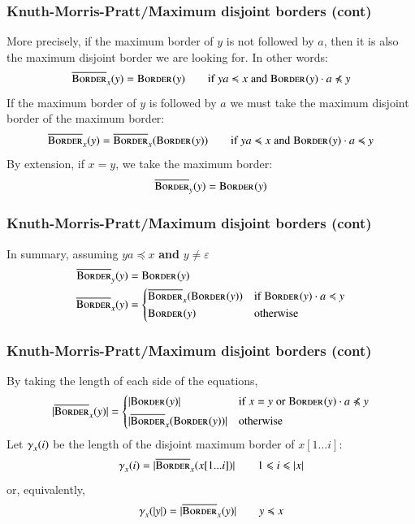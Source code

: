 %
\begin{frame}
\frametitle{Knuth-Morris-Pratt/Maximum disjoint borders (cont)}

More precisely, if the maximum border of \(y\) is not followed by
\(a\), then it is also the maximum disjoint border we are looking
for. In other words:
\[
\DBorder{x}{}{y} = \Border{}{y} \qquad \text{if} \; ya \preccurlyeq x
\; \text{and} \; \Border{}{y} \cdot a \npreccurlyeq y
\]
If the maximum border of \(y\) is followed by \(a\) we must take the
maximum disjoint border of the maximum border:
\[
\overline{\textsc{Border}}_{x}^{}(y) = \overline{\textsc{Border}}_{x}^{}(\textsc{Border}^{}(y))
\qquad \text{if} \; ya \preccurlyeq x \; \text{and} \; \textsc{Border}^{}(y)
\cdot a \preccurlyeq y
\]
By extension, if \(x = y\), we take the maximum border:
\[
\overline{\textsc{Border}}_{y}^{}(y) = \textsc{Border}^{}(y)
\]

\end{frame}

%
\begin{frame}
\frametitle{Knuth-Morris-Pratt/Maximum disjoint borders (cont)}

In summary, assuming \(ya \preccurlyeq x\) \textbf{and} \(y \neq
\varepsilon\)
\[
\begin{aligned}
   \overline{\textsc{Border}}_{y}^{}(y)
&= \textsc{Border}^{}(y)\\
   \overline{\textsc{Border}}_{x}^{}(y)
&= \left\lbrace
   \begin{aligned}
    &  \overline{\textsc{Border}}_{x}^{}(\textsc{Border}^{}(y))
    && \text{if} \; \textsc{Border}^{}(y) \cdot a \preccurlyeq y\\
    &  \textsc{Border}^{}(y)
    && \text{otherwise}
   \end{aligned}
   \right.
\end{aligned}
\]

\end{frame}

%
\begin{frame}
\frametitle{Knuth-Morris-Pratt/Maximum disjoint borders (cont)}

By taking the length of each side of the equations,
\[
  \len{\DBorder{x}{}{y}}
= \left\lbrace
  \begin{aligned}
    &  \len{\Border{}{y}}
    && \text{if} \; x = y \; \text{or}
       \; \Border{}{y} \cdot a \npreccurlyeq y\\
    &  \len{\DBorder{x}{}{\Border{}{y}}}
    && \text{otherwise}
  \end{aligned}
  \right.
\]
Let \(\gamma_{x}^{}(i)\) be the length of the disjoint maximum border of
\(x[1 \dots i]\):
\[
\gamma_{x}^{}(i) = \lvert{\overline{\textsc{Border}}_{x}^{}(x[1...i])}\lvert{}
\qquad 1 \leqslant i \leqslant \lvert{x}\lvert{}
\]
or, equivalently,
\[
\gamma_{x}^{}(\lvert{y}\lvert{}) = \lvert{\overline{\textsc{Border}}_{x}^{}(y)}\lvert{}
\qquad y \preccurlyeq x
\]

\end{frame}

